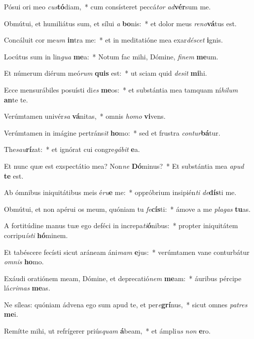 \item Pósui ori meo \textit{cus}\textbf{tó}diam,~* cum consísteret peccá\textit{tor} \textit{ad}\textbf{vér}sum me.
\item Obmútui, et humiliátus sum, et sílui \textit{a} \textbf{bo}nis:~* et dolor meus \textit{re}\textit{no}\textbf{vá}tus est.
\item Concáluit cor me\textit{um} \textbf{in}tra me:~* et in meditatióne mea exar\textit{dé}\textit{scet} \textbf{i}gnis.
\item Locútus sum in lin\textit{gua} \textbf{me}a:~* Notum fac mihi, Dómine, \textit{fi}\textit{nem} \textbf{me}um.
\item Et númerum diérum meó\textit{rum} \textbf{quis} est:~* ut sciam quid \textit{de}\textit{sit} \textbf{mi}hi.
\item Ecce mensurábiles posuísti di\textit{es} \textbf{me}os:~* et substántia mea tamquam ní\textit{hi}\textit{lum} \textbf{an}te te.
\item Verúmtamen univér\textit{sa} \textbf{vá}nitas,~* omnis \textit{ho}\textit{mo} \textbf{vi}vens.
\item Verúmtamen in imágine pertráns\textit{it} \textbf{ho}mo:~* sed et frustra \textit{con}\textit{tur}\textbf{bá}tur.
\item The\textit{sau}\textbf{rí}zat:~* et ignórat cui congre\textit{gá}\textit{bit} \textbf{e}a.
\item Et nunc quæ est exspectátio mea? Non\textit{ne} \textbf{Dó}minus?~* Et substántia mea \textit{a}\textit{pud} \textbf{te} est.
\item Ab ómnibus iniquitátibus meis é\textit{ru}\textbf{e} me:~* oppróbrium insipién\textit{ti} \textit{de}\textbf{dís}ti me.
\item Obmútui, et non apérui os meum, quóniam tu \textit{fe}\textbf{cís}ti:~* ámove a me \textit{pla}\textit{gas} \textbf{tu}as.
\item A fortitúdine manus tuæ ego deféci in increpa\textit{ti}\textbf{ó}nibus:~* propter iniquitátem corripu\textit{ís}\textit{ti} \textbf{hó}minem.
\item Et tabéscere fecísti sicut aráneam áni\textit{mam} \textbf{e}jus:~* verúmtamen vane conturbátur \textit{om}\textit{nis} \textbf{ho}mo.
\item Exáudi oratiónem meam, Dómine, et deprecatió\textit{nem} \textbf{me}am:~* áuribus pércipe lá\textit{cri}\textit{mas} \textbf{me}as.
\item Ne síleas: quóniam ádvena ego sum apud te, et per\textit{e}\textbf{grí}nus,~* sicut omnes \textit{pa}\textit{tres} \textbf{me}i.
\item Remítte mihi, ut refrígerer priús\textit{quam} \textbf{á}beam,~* et ámpli\textit{us} \textit{non} \textbf{e}ro.
